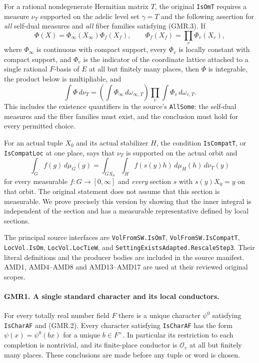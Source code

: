 \documentclass[11pt,a4paper]{article}
\numberwithin{equation}{section}
\theoremstyle{remark}\newtheorem{remark}[theorem]{Remark}
\begin{document}
For a rational nondegenerate Hermitian matrix $T$, the original
\texttt{Is\allowbreak Om\allowbreak T} requires a measure $\nu_T$ supported on the adelic level
set $\gamma=T$ and the following assertion for \emph{all} self-dual
measures and \emph{all} fiber families satisfying (GMR.3).
If
\[
 \Phi(X)=\Phi_\infty(X_\infty)\Phi_f(X_f),\qquad
 \Phi_f(X_f)=\prod_v\Phi_v(X_v),
 \tag{GMR.4}
\]
where $\Phi_\infty$ is continuous with compact support, every $\Phi_v$
is locally constant with compact support, and $\Phi_v$ is the indicator
of the coordinate lattice attached to a single rational $F$-basis of
$E$ at all but finitely many places, then $\Phi$ is integrable,
the product below is multipliable, and
\[
 \int\Phi\,d\nu_T
   =\left(\int\Phi_\infty\,d\omega_{\infty,T}\right)
      \prod_v\int\Phi_v\,d\omega_{v,T}.
 \tag{GMR.5}
\]
This includes the existence quantifiers in the source's
\texttt{All\allowbreak Some}: the self-dual measures and the fiber families must
exist, and the conclusion must hold for every permitted choice.

For an actual tuple $X_0$ and its actual stabilizer $H$, the condition
\texttt{Is\allowbreak Compat\allowbreak T}, or \texttt{Is\allowbreak Compat\allowbreak Loc} at one place, says that
$\nu_T$ is supported on the actual orbit and
\[
 \int_G f(g)\,d\mu_G(g)
  =\int_{G X_0}\int_H f(s(y)h)\,d\mu_H(h)\,d\nu_T(y)
 \tag{GMR.6}
\]
for every measurable $f:G\to[0,\infty]$ and \emph{every} section $s$
with $s(y)X_0=y$ on that orbit.  The original statement does not assume
that this section is measurable.  We prove precisely this version by
showing that the inner integral is independent of the section and has
a measurable representative defined by local sections.

The principal source interfaces are
\texttt{Vol\allowbreak From\allowbreak SW.\allowbreak Is\allowbreak Om\allowbreak T}, \texttt{Vol\allowbreak From\allowbreak SW.\allowbreak Is\allowbreak Compat\allowbreak T},
\texttt{Loc\allowbreak Vol.\allowbreak Is\allowbreak Om}, \texttt{Loc\allowbreak Vol.\allowbreak Loc\allowbreak Tie\allowbreak W}, and
\texttt{Setting\allowbreak Exists\allowbreak Adapted.\allowbreak Rescale\allowbreak Step3}.  Their literal definitions
and the producer bodies are included in the source manifest.  AMD1,
AMD4--AMD8 and AMD13--AMD17 are used at their reviewed original scopes.

\paragraph{GMR1. A single standard character and its local conductors.}
\label{claim:GMR1}
For every totally real number field $F$ there is a unique character
$\psi^0$ satisfying \texttt{Is\allowbreak Char\allowbreak AF} and (GMR.2).
Every character satisfying \texttt{Is\allowbreak Char\allowbreak AF} has the form
$\psi(x)=\psi^0(bx)$ for a unique $b\in F^\times$.
In particular its restriction to each completion is nontrivial, and
its finite-place conductor is $\mathcal O_v$ at all but finitely many
places.  These conclusions are made before any tuple or word is chosen.
\end{document}
